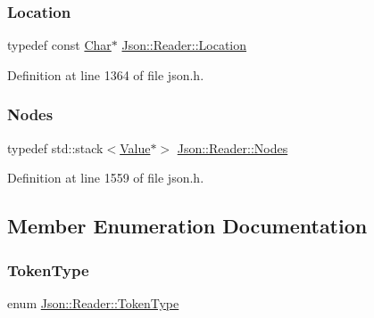 \subsubsection{\texorpdfstring{Location}{Location}}
{\footnotesize\ttfamily typedef const \hyperlink{class_json_1_1_reader_a3eec9118f3e9a672ba8348c3a79d0f45}{Char}$\ast$ \hyperlink{class_json_1_1_reader_a46795b5b272bf79a7730e406cb96375a}{Json\+::\+Reader\+::\+Location}}



Definition at line 1364 of file json.\+h.

\mbox{\label{class_json_1_1_reader_a8da2114fe8b8124d41ea2f3434f0171b}} 
\subsubsection{\texorpdfstring{Nodes}{Nodes}}
{\footnotesize\ttfamily typedef std\+::stack$<$\hyperlink{class_json_1_1_value}{Value}$\ast$$>$ \hyperlink{class_json_1_1_reader_a8da2114fe8b8124d41ea2f3434f0171b}{Json\+::\+Reader\+::\+Nodes}\hspace{0.3cm}{\ttfamily [private]}}



Definition at line 1559 of file json.\+h.



\subsection{Member Enumeration Documentation}
\mbox{\label{class_json_1_1_reader_aa35e6ab574dc399a0a645ad98ed66bc9}} 
\subsubsection{\texorpdfstring{Token\+Type}{TokenType}}
{\footnotesize\ttfamily enum \hyperlink{class_json_1_1_reader_aa35e6ab574dc399a0a645ad98ed66bc9}{Json\+::\+Reader\+::\+Token\+Type}\hspace{0.3cm}{\ttfamily [private]}}

